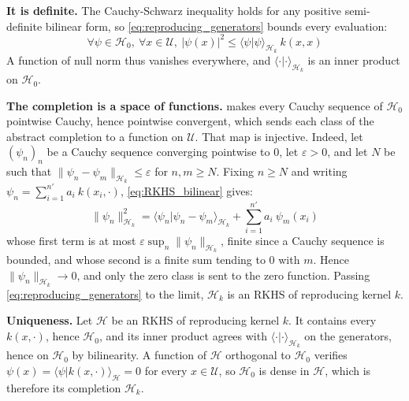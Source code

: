 \textbf{It is definite.} The Cauchy-Schwarz inequality holds for any positive semi-definite bilinear form, so \eqref{eq:reproducing_generators} bounds every evaluation:
\begin{equation}
	\forall\psi\in\mathcal{H}_0,\:\forall x\in\mathcal{U},\:|\psi(x)|^2\leq\langle\psi|\psi\rangle_{\mathcal{H}_k}\:k(x,x)\label{eq:RKHS_evaluation_bound}
\end{equation}
A function of null norm thus vanishes everywhere, and $\langle\cdot|\cdot\rangle_{\mathcal{H}_k}$ is an inner product on $\mathcal{H}_0$.

\textbf{The completion is a space of functions.}  makes every Cauchy sequence of $\mathcal{H}_0$ pointwise Cauchy, hence pointwise convergent, which sends each class of the abstract completion to a function on $\mathcal{U}$. That map is injective. Indeed, let $(\psi_n)_n$ be a Cauchy sequence converging pointwise to $0$, let $\varepsilon>0$, and let $N$ be such that $\|\psi_n-\psi_m\|_{\mathcal{H}_k}\leq\varepsilon$ for $n,m\geq N$. Fixing $n\geq N$ and writing $\psi_n=\sum_{i=1}^{n'}a_i\:k(x_i,\cdot)$, \eqref{eq:RKHS_bilinear} gives:
\begin{equation}
	\|\psi_n\|_{\mathcal{H}_k}^2=\langle\psi_n|\psi_n-\psi_m\rangle_{\mathcal{H}_k}+\sum_{i=1}^{n'}a_i\:\psi_m(x_i)
\end{equation}
whose first term is at most $\varepsilon\sup_n\|\psi_n\|_{\mathcal{H}_k}$, finite since a Cauchy sequence is bounded, and whose second is a finite sum tending to $0$ with $m$. Hence $\|\psi_n\|_{\mathcal{H}_k}\to0$, and only the zero class is sent to the zero function. Passing \eqref{eq:reproducing_generators} to the limit, $\mathcal{H}_k$ is an RKHS of reproducing kernel $k$.

\textbf{Uniqueness.} Let $\mathcal{H}$ be an RKHS of reproducing kernel $k$. It contains every $k(x,\cdot)$, hence $\mathcal{H}_0$, and its inner product agrees with $\langle\cdot|\cdot\rangle_{\mathcal{H}_k}$ on the generators, hence on $\mathcal{H}_0$ by bilinearity. A function of $\mathcal{H}$ orthogonal to $\mathcal{H}_0$ verifies $\psi(x)=\langle\psi|k(x,\cdot)\rangle_{\mathcal{H}}=0$ for every $x\in\mathcal{U}$, so $\mathcal{H}_0$ is dense in $\mathcal{H}$, which is therefore its completion $\mathcal{H}_k$.
